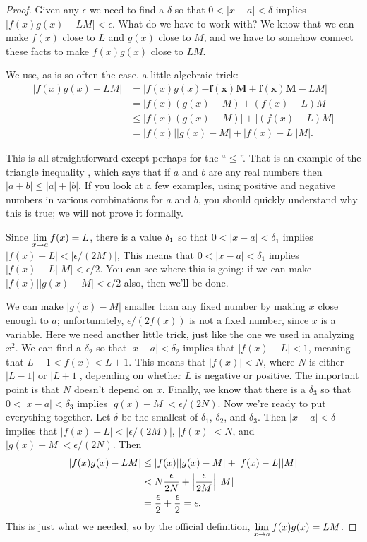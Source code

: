 \begin{proof} 
Given any $\epsilon$ we need to find a $\delta$ so that
$0<|x-a|<\delta$ implies $|f(x)g(x)-LM|<\epsilon$. What do we have to
work with? We know that we can make $f(x)$ close to $L$ and $g(x)$
close to $M$, and we have to somehow connect these facts to make
$f(x)g(x)$ close to $LM$.

We use, as is so often the case, a little algebraic
trick: 
\begin{align*}
|f(x)g(x)-LM| &= |f(x)g(x)\boldsymbol{-f(x)M+f(x)M}-LM| \\
&=|f(x)(g(x)-M)+(f(x)-L)M| \\
&\le |f(x)(g(x)-M)|+|(f(x)-L)M| \\
&=|f(x)||g(x)-M|+|f(x)-L||M|.
\end{align*}

This is all straightforward except perhaps for the ``$\le$''. That is
an example of the {\dfont triangle inequality%
}, 
which says that if $a$ and $b$ are any real
numbers then $|a+b|\le |a|+|b|$. If you look at a few examples, using
positive and negative numbers in various combinations for $a$ and $b$,
you should quickly understand why this is true; we will not prove it
formally. 

Since $\displaystyle \lim_{x\to a}f(x) =L$, there is a value $\displaystyle \delta_1$ so that
$0<|x-a|<\delta_1$ implies $|f(x)-L|<|\epsilon/(2M)|$, 
This means that $0<|x-a|<\delta_1$ implies
$|f(x)-L||M|< \epsilon/2$. You can see where this is going: if we can
make $|f(x)||g(x)-M|<\epsilon/2$ also, then we'll be done.

We can make $|g(x)-M|$ smaller than any fixed number by making $x$
close enough to $a$; unfortunately, $\epsilon/(2f(x))$ is not a fixed
number, since $x$ is a variable. Here we need another little trick,
just like the one we used in analyzing $x^2$. We can find a $\delta_2$
so that $|x-a|<\delta_2$ implies that $|f(x)-L|<1$, meaning that $L-1
< f(x) < L+1$. This means that $|f(x)|<N$, where $N$ is either $|L-1|$
or $|L+1|$, depending on whether $L$ is negative or positive. The
important point is that $N$ doesn't depend on $x$. Finally, we know that
there is a $\delta_3$ so that $0<|x-a|<\delta_3$ implies
$|g(x)-M|<\epsilon/(2N)$. Now we're ready to put everything
together. Let $\delta$ be the smallest of $\delta_1$, $\delta_2$, and
$\delta_3$. Then $|x-a|<\delta$ implies that
$|f(x)-L|<|\epsilon/(2M)|$, $|f(x)|<N$, and
$|g(x)-M|<\epsilon/(2N)$. Then 
\begin{align*}
|f(x)g(x)-LM|&\le|f(x)||g(x)-M|+|f(x)-L||M| \\
&<N{\epsilon\over 2N}+\left|{\epsilon\over 2M}\right||M| \\
&={\epsilon\over 2}+{\epsilon\over 2}=\epsilon.
\end{align*}
This is just what we needed, so by the official definition,
$\displaystyle \lim_{x\to a}f(x)g(x)=LM$.
\end{proof}

